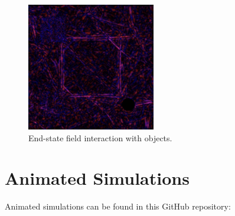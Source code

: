 \documentclass[12pt]{article}
\begin{document}
\begin{spacing}{1.5}
\begin{figure}[h!]
    \centering
    \includegraphics[width=0.5\textwidth]{sim3}
    \caption{End-state field interaction with objects.}
    \label{fig:sim3}
\end{figure}

\FloatBarrier

\section{Animated Simulations}

Animated simulations can be found in this GitHub repository: 





\end{spacing}
\end{document}
